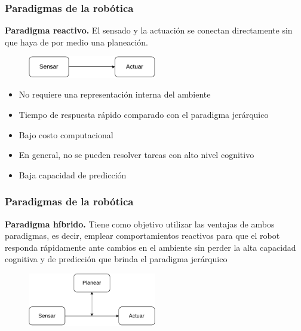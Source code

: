 \begin{frame}\frametitle{Paradigmas de la robótica}
  \textbf{Paradigma reactivo.} El sensado y la actuación se conectan directamente sin que haya de por medio una planeación.
  \begin{figure}
    \centering
    \includegraphics[width=0.5\textwidth]{Figures/ParadigmReactive.pdf}
  \end{figure}
  \begin{itemize}
  \item No requiere una representación interna del ambiente
  \item Tiempo de respuesta rápido comparado con el paradigma jerárquico
  \item Bajo costo computacional
  \item En general, no se pueden resolver tareas con alto nivel cognitivo
  \item Baja capacidad de predicción
  \end{itemize}
\end{frame}

\begin{frame}\frametitle{Paradigmas de la robótica}
  \textbf{Paradigma híbrido.} Tiene como objetivo utilizar las ventajas de ambos paradigmas, es decir, emplear comportamientos reactivos para que el robot responda rápidamente ante cambios en el ambiente sin perder la alta capacidad cognitiva y de predicción que brinda el paradigma jerárquico
  \begin{figure}
    \centering
    \includegraphics[width=0.5\textwidth]{Figures/ParadigmHybrid.pdf}
  \end{figure}
\end{frame}

